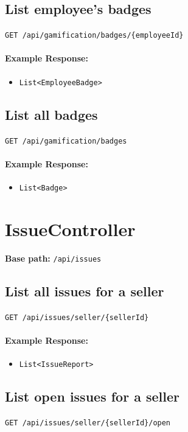 \documentclass[a4paper,11pt]{article}
\begin{document}
\subsection{List employee's badges}
\texttt{GET /api/gamification/badges/\{employeeId\}}

\paragraph{Example Response:}
\begin{itemize}
    \item \texttt{List<EmployeeBadge>}
\end{itemize}

\subsection{List all badges}
\texttt{GET /api/gamification/badges}

\paragraph{Example Response:}
\begin{itemize}
    \item \texttt{List<Badge>}
\end{itemize}

\hrulefill

\section{IssueController}
\textbf{Base path:} \texttt{/api/issues}

\subsection{List all issues for a seller}
\texttt{GET /api/issues/seller/\{sellerId\}}

\paragraph{Example Response:}
\begin{itemize}
    \item \texttt{List<IssueReport>}
\end{itemize}

\subsection{List open issues for a seller}
\texttt{GET /api/issues/seller/\{sellerId\}/open}
\end{document}
